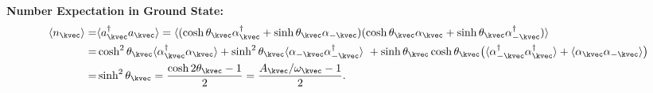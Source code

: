 \noindent\textbf{Number Expectation in Ground State:}
\begin{align}
    \langle n_{\kvec} \rangle 
    = & \langle a_{\kvec}^{\dagger} a_{\kvec} \rangle 
    =  \langle 
    ( \cosh \theta_{\kvec} \alpha_{\kvec}^{\dagger} + \sinh \theta_{\kvec} \alpha_{-\kvec} ) 
    ( \cosh \theta_{\kvec} \alpha_{\kvec} + \sinh \theta_{\kvec} \alpha_{-\kvec}^{\dagger} ) 
    \rangle \\
    = & \cosh^{2} \theta_{\kvec} \langle  \alpha_{\kvec}^{\dagger} \alpha_{\kvec} \rangle 
    + \sinh^{2} \theta_{\kvec} \langle \alpha_{-\kvec} \alpha_{-\kvec}^{\dagger} \rangle \
    + \sinh \theta_{\kvec} \cosh \theta_{\kvec} 
    \big(\langle \alpha_{-\kvec}^{\dagger} \alpha_{\kvec}^{\dagger} \rangle + \langle \alpha_{\kvec} \alpha_{-\kvec} \rangle \big) \\
    = & \sinh^{2} \theta_{\kvec} 
    = \frac{\cosh 2 \theta_{\kvec} - 1}{2} 
    = \frac{A_{\kvec} / \omega_{\kvec} - 1}{2}.
\end{align}

